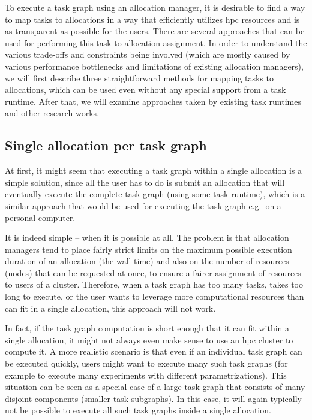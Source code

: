 To execute a task graph using an allocation manager, it is desirable to find a way to map tasks to
allocations in a way that efficiently utilizes \gls{hpc} resources and is
as transparent as possible for the users. There are several approaches that can be used for performing this
task-to-allocation assignment. In order to understand the various trade-offs and constraints being involved (which are
mostly caused by various performance bottlenecks and limitations of existing allocation managers),
we will first describe three straightforward methods for mapping tasks to allocations, which can be used even without any
special support from a task runtime. After that, we will examine approaches taken by existing task runtimes and other
research works.

\subsection*{Single allocation per task graph}
At first, it might seem that executing a task graph within a single allocation is a simple
solution, since all the user has to do is submit an allocation that will eventually execute the
complete task graph (using some task runtime), which is a similar approach that would be used for
executing the task graph e.g.\ on a personal computer.

It is indeed simple -- when it is possible at all. The problem is that allocation managers tend to
place fairly strict limits on the maximum possible execution duration of an allocation (the
wall-time) and also on the number of resources (nodes) that can be requested at once, to ensure a
fairer assignment of resources to users of a cluster. Therefore, when a task graph has too many
tasks, takes too long to execute, or the user wants to leverage more computational resources than
can fit in a single allocation, this approach will not work.

In fact, if the task graph computation is short enough that it can fit within a single allocation,
it might not always even make sense to use an \gls{hpc} cluster to compute it. A
more realistic scenario is that even if an individual task graph can be executed quickly, users
might want to execute many such task graphs (for example to execute many experiments with different
parametrizations). This situation can be seen as a special case of a large task graph that consists
of many disjoint components (smaller task subgraphs). In this case, it will again typically not be
possible to execute all such task graphs inside a single allocation.

